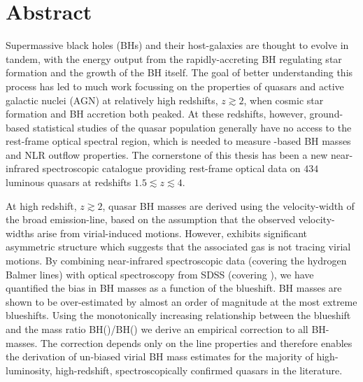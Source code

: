 \begingroup
\let\clearpage\relax
\let\cleardoublepage\relax
\let\cleardoublepage\relax

\chapter*{Abstract}

Supermassive black holes (BHs) and their host-galaxies are thought to evolve in tandem, with the energy output from the rapidly-accreting BH regulating star formation and the growth of the BH itself. 
The goal of better understanding this process has led to much work focussing on the properties of quasars and active galactic nuclei (AGN) at relatively high redshifts, $z\gtrsim 2$, when cosmic star formation and BH accretion both peaked. 
At these redshifts, however, ground-based statistical studies of the quasar population generally have no access to the rest-frame optical spectral region, which is needed to measure \hbns-based BH masses and NLR outflow properties. 
The cornerstone of this thesis has been a new near-infrared spectroscopic catalogue providing rest-frame optical data on $434$ luminous quasars at redshifts $1.5 \lesssim z \lesssim 4$.

At high redshift, $z \gtrsim 2$, quasar BH masses are derived using the velocity-width of the  broad emission-line, based on the assumption that the observed velocity-widths arise from virial-induced motions.  
However,  exhibits significant asymmetric structure which suggests that the associated gas is not tracing virial motions. 
By combining near-infrared spectroscopic data (covering the hydrogen Balmer lines) with optical spectroscopy from SDSS (covering ), we have quantified the bias in  BH masses as a function of the  blueshift. 
 BH masses are shown to be over-estimated by almost an order of magnitude at the most extreme blueshifts.
Using the monotonically increasing relationship between the  blueshift and the mass ratio BH()/BH(\hans) we derive an empirical correction to all  BH-masses.
The correction depends only on the  line properties and therefore enables the derivation of un-biased virial BH mass estimates for the majority of high-luminosity, high-redshift, spectroscopically confirmed quasars in the literature. 

